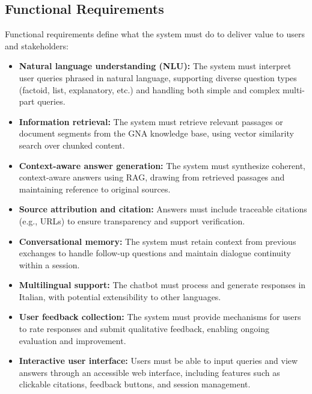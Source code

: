 \begin{spacing}{1.5}
\subsection{Functional Requirements}
Functional requirements define what the system must do to deliver value to users and stakeholders:
\begin{itemize}
    \item \textbf{Natural language understanding (NLU):} The system must interpret user queries phrased in natural language, supporting diverse question types (factoid, list, explanatory, etc.) and handling both simple and complex multi-part queries.
    \item \textbf{Information retrieval:} The system must retrieve relevant passages or document segments from the GNA knowledge base, using vector similarity search over chunked content.
    \item \textbf{Context-aware answer generation:} The system must synthesize coherent, context-aware answers using RAG, drawing from retrieved passages and maintaining reference to original sources.
    \item \textbf{Source attribution and citation:} Answers must include traceable citations (e.g., URLs) to ensure transparency and support verification.
    \item \textbf{Conversational memory:} The system must retain context from previous exchanges to handle follow-up questions and maintain dialogue continuity within a session.
    \item \textbf{Multilingual support:} The chatbot must process and generate responses in Italian, with potential extensibility to other languages.
    \item \textbf{User feedback collection:} The system must provide mechanisms for users to rate responses and submit qualitative feedback, enabling ongoing evaluation and improvement.
    \item \textbf{Interactive user interface:} Users must be able to input queries and view answers through an accessible web interface, including features such as clickable citations, feedback buttons, and session management.
\end{itemize}


\end{spacing}
